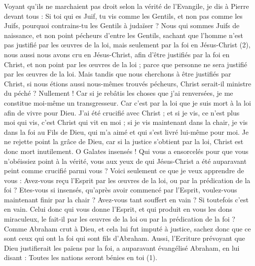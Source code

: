 \begin{multicols}{2}
Voyant qu'ils ne marchaient pas droit selon la vérité de l'Evangile, je dis à Pierre devant tous : Si toi qui es Juif, tu vis comme les Gentils, et non pas comme les Juifs, pourquoi contrains-tu les Gentils à judaïser ?
Nous qui sommes Juifs de naissance, et non point pécheurs d'entre les Gentils,
sachant que l'homme n'est pas justifié par les œuvres de la loi, mais seulement par la foi en Jésus-Christ (2), nous aussi nous avons cru en Jésus-Christ, afin d’être justifiés par la foi en Christ, et non point par les œuvres de la loi ; parce que personne ne sera justifié par les œuvres de la loi.
Mais tandis que nous cherchons à être justifiés par Christ, si nous étions aussi nous-mêmes trouvés pécheurs, Christ serait-il ministre du péché ? Nullement !
Car si je rebâtis les choses que j'ai renversées, je me constitue moi-même un transgresseur.
Car c’est par la loi que je suis mort à la loi afin de vivre pour Dieu.
J’ai été crucifié avec Christ ; et si je vis, ce n’est plus moi qui vis, c’est Christ qui vit en moi ; si je vis maintenant dans la chair, je vis dans la foi au Fils de Dieu, qui m’a aimé et qui s’est livré lui-même pour moi.
Je ne rejette point la grâce de Dieu, car si la justice s’obtient par la loi, Christ est donc mort inutilement.
\VerseOne{}O Galates insensés ! Qui vous a ensorcelés pour que vous n'obéissiez point à la vérité, vous aux yeux de qui Jésus-Christ a été auparavant peint comme crucifié parmi vous ?
Voici seulement ce que je veux apprendre de vous : Avez-vous reçu l'Esprit par les œuvres de la loi, ou par la prédication de la foi ?
Etes-vous si insensés, qu’après avoir commencé par l'Esprit, voulez-vous maintenant finir par la chair ?
Avez-vous tant souffert en vain ? Si toutefois c'est en vain.
Celui donc qui vous donne l'Esprit, et qui produit en vous les dons miraculeux, le fait-il par les œuvres de la loi ou par la prédication de la foi ?
Comme Abraham crut à Dieu, et cela lui fut imputé à justice,
sachez donc que ce sont ceux qui ont la foi qui sont fils d'Abraham.
Aussi, l'Ecriture prévoyant que Dieu justifierait les païens par la foi, a auparavant évangélisé Abraham, en lui disant : Toutes les nations seront bénies en toi (1).

\end{multicols}
